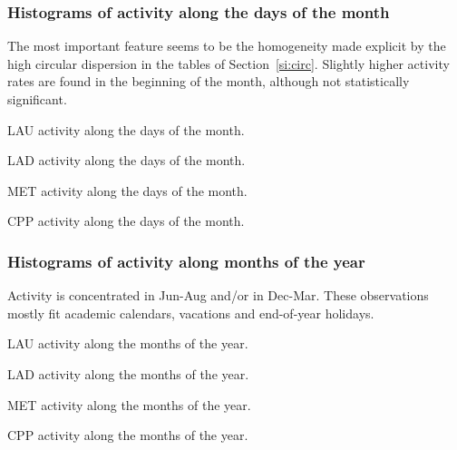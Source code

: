 \documentclass[%
 aip,
 jmp,%
 amsmath,amssymb,
 reprint,%
 floatfix,
]{revtex4-1}
\begin{document}
\FloatBarrier
\subsubsection{Histograms of activity along the days of the month}\label{si:monthdays}
The most important feature seems to be the homogeneity made explicit by the high circular dispersion in the tables of Section~\ref{si:circ}. Slightly higher activity rates are found in the beginning of the month, although not statistically significant.
\begin{table}[!h]
	\caption{LAU activity along the days of the month.}
	\footnotesize
	
\label{tab:min}
\end{table}
\begin{table}[!h]
	\caption{LAD activity along the days of the month.}
	\footnotesize
	
\label{tab:min}
\end{table}
\begin{table}[!h]
	\caption{MET activity along the days of the month.}
	\footnotesize
	
\label{tab:min}
\end{table}
\begin{table}[!h]
	\caption{CPP activity along the days of the month.}
	\footnotesize
	
\label{tab:min}
\end{table}

\FloatBarrier
\subsubsection{Histograms of activity along months of the year}\label{si:months}
	Activity is concentrated in Jun-Aug and/or in Dec-Mar.
	These observations mostly fit academic calendars, vacations and end-of-year holidays.
\begin{table}[!h]
	\caption{LAU activity along the months of the year.}
	\footnotesize
	
\label{tab:min2}
\end{table}
\begin{table}[!h]
	\caption{LAD activity along the months of the year.}
	\footnotesize
	
\label{tab:min2}
\end{table}
\begin{table}[!h]
	\caption{MET activity along the months of the year.}
	\footnotesize
	
\label{tab:min2}
\end{table}

\begin{table}[!h]
	\caption{CPP activity along the months of the year.}
	\footnotesize
	
\label{tab:min2}
\end{table}
\end{document}
